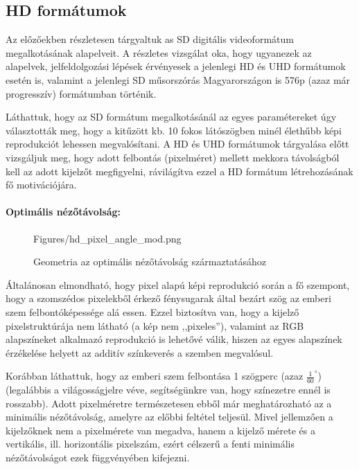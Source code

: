\subsection{HD formátumok}

Az előzőekben részletesen tárgyaltuk as SD digitális videoformátum megalkotásának alapelveit.
A részletes vizsgálat oka, hogy ugyanezek az alapelvek, jelfeldolgozási lépések érvényesek a jelenlegi HD és UHD formátumok esetén is, valamint a jelenlegi SD műsorszórás Magyarországon is 576p (azaz már progresszív) formátumban történik.

Láthattuk, hogy az SD formátum megalkotásánál az egyes paramétereket úgy választották meg, hogy a kitűzött kb. 10 fokos látószögben minél élethűbb képi reprodukciót lehessen megvalósítani.
A HD és UHD formátumok tárgyalása előtt vizsgáljuk meg, hogy adott felbontás (pixelméret) mellett mekkora távolságból kell az adott kijelzőt megfigyelni, rávilágítva ezzel a HD formátum létrehozásának fő motivációjára.

\paragraph{Optimális nézőtávolság:\\}

\begin{figure}[]
	\centering
	\begin{overpic}[width = 0.67 \columnwidth ]{Figures/hd_pixel_angle_mod.png}
	\small
	\end{overpic}
	\caption{Geometria az optimális nézőtávolság származtatásához}
	\label{Fig:optimal_vd}
\end{figure}

Általánosan elmondható, hogy pixel alapú képi reprodukció során a fő szempont, hogy a szomszédos pixelekből érkező fénysugarak által bezárt szög az emberi szem felbontóképessége alá essen.
Ezzel biztosítva van, hogy a kijelző pixelstruktúrája nem látható (a kép nem ,,pixeles''), valamint az RGB alapszíneket alkalmazó reprodukció is lehetővé válik, hiszen az egyes alapszínek érzékelése helyett az additív színkeverés a szemben megvalósul.

Korábban láthattuk, hogy az emberi szem felbontása 1 szögperc (azaz $\frac{1}{60}^{\circ}$) (legalábbis a világosságjelre véve, segítségünkre van, hogy színezetre ennél is rosszabb).
Adott pixelméretre természetesen ebből már meghatározható az a minimális nézőtávolság, amelyre az előbbi feltétel teljesül.
Mivel jellemzően a kijelzőknek nem a pixelmérete van megadva, hanem a kijelző mérete és a vertikális, ill. horizontális pixelszám, ezért célszerű a fenti minimális nézőtávolságot ezek függvényében kifejezni.

